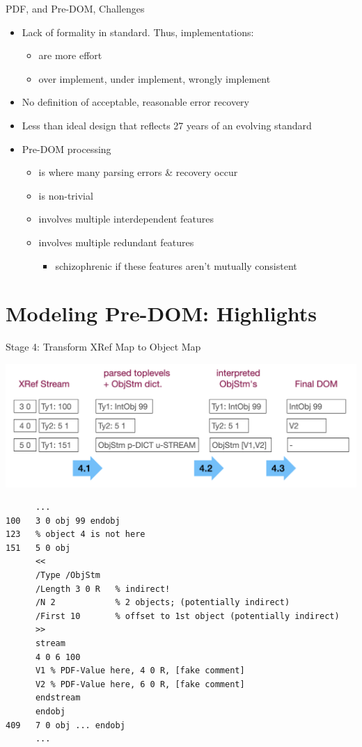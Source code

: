 \documentclass[t,10pt,xcolor={dvipsnames}]{beamer}
\begin{document}
\begin{frame}[label={sec:orge1630f0}]{PDF, and Pre-DOM, Challenges}
\begin{itemize}
\item Lack of formality in standard. Thus, implementations:
\begin{itemize}
\item are more effort
\item over implement, under implement, wrongly implement
\end{itemize}
\item No definition of acceptable, reasonable error recovery
\item Less than ideal design that reflects 27 years of an evolving standard
\item Pre-DOM processing
\begin{itemize}
\item is where many parsing errors \& recovery occur
\item is non-trivial
\item involves multiple interdependent features
\item involves multiple redundant features
\begin{itemize}
\item schizophrenic if these features aren't mutually consistent
\end{itemize}
\end{itemize}
\end{itemize}
\end{frame}

\section{Modeling Pre-DOM: Highlights}
\label{sec:org6478eeb}
\begin{frame}[label={sec:org75237ea},fragile]{Stage 4: Transform XRef Map to Object Map}
 \begin{center}
\includegraphics[width=0.8\linewidth]{images/diagram1/cropped-diagram1.001.png}
\end{center}
\lstset{language=bash,label= ,caption= ,captionpos=b,numbers=none}
\begin{lstlisting}
      ...
100   3 0 obj 99 endobj
123   % object 4 is not here
151   5 0 obj
      <<
      /Type /ObjStm
      /Length 3 0 R   % indirect!
      /N 2            % 2 objects; (potentially indirect)
      /First 10       % offset to 1st object (potentially indirect)
      >>
      stream
      4 0 6 100
      V1 % PDF-Value here, 4 0 R, [fake comment] 
      V2 % PDF-Value here, 6 0 R, [fake comment]
      endstream
      endobj
409   7 0 obj ... endobj
      ...
\end{lstlisting}
\end{frame}
\end{document}
